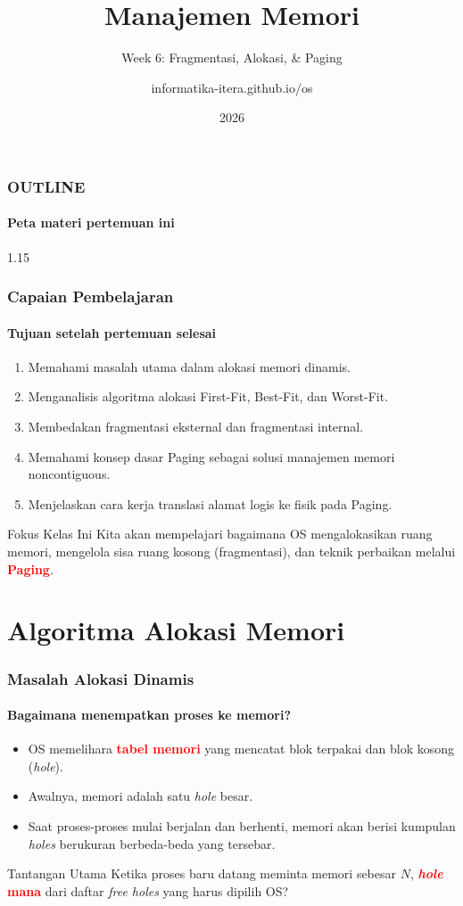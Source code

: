 \documentclass[t,aspectratio=169,xcolor=dvipsnames]{beamer}
\title[Memory Management]{Manajemen Memori}
\subtitle{Week 6: Fragmentasi, Alokasi, \& Paging}
\author[informatika-itera.github.io/os]{informatika-itera.github.io/os}
\institute[ITERA]{Program Studi Teknik Informatika \\ Institut Teknologi Sumatera}
\date{\textcolor{nyublue}{2026}}
\newcommand{\tem}[1]{\textbf{\textcolor{red}{#1}}}
\begin{document}
\begin{frame}
    \titlepage
\end{frame}

\begin{frame}
    \frametitle{OUTLINE}
    \framesubtitle{Peta materi pertemuan ini}
    \small
    \begin{spacing}{1.15}
        \tableofcontents
    \end{spacing}
\end{frame}

\begin{frame}
    \frametitle{Capaian Pembelajaran}
    \framesubtitle{Tujuan setelah pertemuan selesai}
    \small
    \begin{enumerate}
        \item Memahami masalah utama dalam alokasi memori dinamis.
        \item Menganalisis algoritma alokasi First-Fit, Best-Fit, dan Worst-Fit.
        \item Membedakan fragmentasi eksternal dan fragmentasi internal.
        \item Memahami konsep dasar Paging sebagai solusi manajemen memori noncontiguous.
        \item Menjelaskan cara kerja translasi alamat logis ke fisik pada Paging.
    \end{enumerate}
    \begin{exampleblock}{Fokus Kelas Ini}
        Kita akan mempelajari bagaimana OS mengalokasikan ruang memori, mengelola sisa ruang kosong (fragmentasi), dan teknik perbaikan melalui \tem{Paging}.
    \end{exampleblock}
\end{frame}

\section{Algoritma Alokasi Memori}

\begin{frame}
    \frametitle{Masalah Alokasi Dinamis}
    \framesubtitle{Bagaimana menempatkan proses ke memori?}
    \small
    \begin{itemize}
        \item OS memelihara \tem{tabel memori} yang mencatat blok terpakai dan blok kosong (\textit{hole}).
        \item Awalnya, memori adalah satu \textit{hole} besar.
        \item Saat proses-proses mulai berjalan dan berhenti, memori akan berisi kumpulan \textit{holes} berukuran berbeda-beda yang tersebar.
    \end{itemize}
    \vspace{0.2cm}
    \begin{alertblock}{Tantangan Utama}
        Ketika proses baru datang meminta memori sebesar $N$, \tem{\textit{hole} mana} dari daftar \textit{free holes} yang harus dipilih OS?
    \end{alertblock}
\end{frame}
\end{document}
